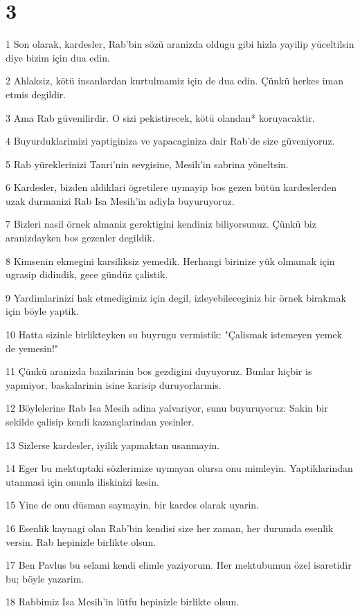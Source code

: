 \chapter{3}

\par 1 Son olarak, kardesler, Rab'bin sözü aranizda oldugu gibi hizla yayilip yüceltilsin diye bizim için dua edin.
\par 2 Ahlaksiz, kötü insanlardan kurtulmamiz için de dua edin. Çünkü herkes iman etmis degildir.
\par 3 Ama Rab güvenilirdir. O sizi pekistirecek, kötü olandan* koruyacaktir.
\par 4 Buyurduklarimizi yaptiginiza ve yapacaginiza dair Rab'de size güveniyoruz.
\par 5 Rab yüreklerinizi Tanri'nin sevgisine, Mesih'in sabrina yöneltsin.
\par 6 Kardesler, bizden aldiklari ögretilere uymayip bos gezen bütün kardeslerden uzak durmanizi Rab Isa Mesih'in adiyla buyuruyoruz.
\par 7 Bizleri nasil örnek almaniz gerektigini kendiniz biliyorsunuz. Çünkü biz aranizdayken bos gezenler degildik.
\par 8 Kimsenin ekmegini karsiliksiz yemedik. Herhangi birinize yük olmamak için ugrasip didindik, gece gündüz çalistik.
\par 9 Yardimlarinizi hak etmedigimiz için degil, izleyebileceginiz bir örnek birakmak için böyle yaptik.
\par 10 Hatta sizinle birlikteyken su buyrugu vermistik: "Çalismak istemeyen yemek de yemesin!"
\par 11 Çünkü aranizda bazilarinin bos gezdigini duyuyoruz. Bunlar hiçbir is yapmiyor, baskalarinin isine karisip duruyorlarmis.
\par 12 Böylelerine Rab Isa Mesih adina yalvariyor, sunu buyuruyoruz: Sakin bir sekilde çalisip kendi kazançlarindan yesinler.
\par 13 Sizlerse kardesler, iyilik yapmaktan usanmayin.
\par 14 Eger bu mektuptaki sözlerimize uymayan olursa onu mimleyin. Yaptiklarindan utanmasi için onunla iliskinizi kesin.
\par 15 Yine de onu düsman saymayin, bir kardes olarak uyarin.
\par 16 Esenlik kaynagi olan Rab'bin kendisi size her zaman, her durumda esenlik versin. Rab hepinizle birlikte olsun.
\par 17 Ben Pavlus bu selami kendi elimle yaziyorum. Her mektubumun özel isaretidir bu; böyle yazarim.
\par 18 Rabbimiz Isa Mesih'in lütfu hepinizle birlikte olsun.


